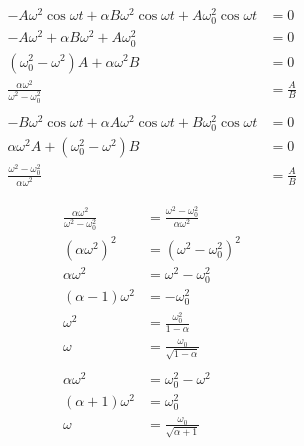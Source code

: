 \documentclass{article}
\begin{document}
\begin{align*}
  -A \omega^2 \cos \omega t + \alpha B \omega^2 \cos \omega t + A \omega_0^2 \cos \omega t & = 0           \\
  -A \omega^2 + \alpha B \omega^2 + A \omega_0^2                                           & = 0           \\
  (\omega_0^2 - \omega^2) A + \alpha \omega^2 B                                            & = 0           \\
  \frac{\alpha \omega^2}{\omega^2 - \omega_0^2}                                            & = \frac{A}{B} \\ \\
  -B \omega^2 \cos \omega t + \alpha A \omega^2 \cos \omega t + B \omega_0^2 \cos \omega t & = 0           \\
  \alpha \omega^2 A + (\omega_0^2 - \omega^2) B                                            & = 0           \\
  \frac{\omega^2 - \omega_0^2}{\alpha \omega^2}                                            & = \frac{A}{B}
\end{align*}

\begin{align*}
  \frac{\alpha \omega^2}{\omega^2 - \omega_0^2} & = \frac{\omega^2 - \omega_0^2}{\alpha \omega^2} \\
  (\alpha \omega^2)^2                           & = (\omega^2 - \omega_0^2)^2                     \\
  \alpha \omega^2                               & = \omega^2 - \omega_0^2                         \\
  (\alpha - 1) \omega^2                         & = -\omega_0^2                                   \\
  \omega^2                                      & = \frac{\omega_0^2}{1 - \alpha}                 \\
  \omega                                        & = \frac{\omega_0}{\sqrt{1 - \alpha}}            \\ \\
  \alpha \omega^2                               & = \omega_0^2 - \omega^2                         \\
  (\alpha + 1) \omega^2                         & = \omega_0^2                                    \\
  \omega                                        & = \frac{\omega_0}{\sqrt{\alpha + 1}}
\end{align*}
\end{document}
